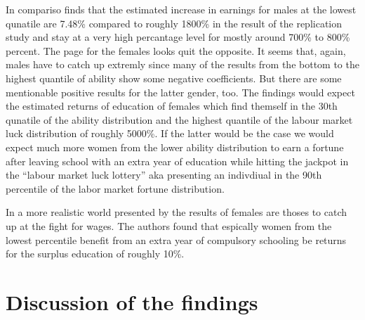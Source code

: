 \documentclass[12pt,a4paper]{article}
\begin{document}
In compariso \textcite{brunello} finds that the estimated increase in
earnings for males at the lowest qunatile are 7.48\% compared to roughly
1800\% in the result of the replication study and stay at a very high
percantage level for mostly around 700\% to 800\% percent. The page for
the females looks quit the opposite. It seems that, again, males have to
catch up extremly since many of the results from the bottom to the
highest quantile of ability show some negative coefficients. But there
are some mentionable positive results for the latter gender, too. The
findings would expect the estimated returns of education of females
which find themself in the 30th qunatile of the ability distribution and
the highest quantile of the labour market luck distribution of roughly
5000\%. If the latter would be the case we would expect much more women
from the lower ability distribution to earn a fortune after leaving
school with an extra year of education while hitting the jackpot in the
\enquote{labour market luck lottery} aka presenting an indivdiual in the
90th percentile of the labor market fortune distribution.

In a more realistic world presented by the results of
\textcite{brunello} females are thoses to catch up at the fight for
wages. The authors found that espically women from the lowest percentile
benefit from an extra year of compulsory schooling be returns for the
surplus education of roughly 10\%.

\section{Discussion of the findings}\label{discussion-of-the-findings}
\end{document}
